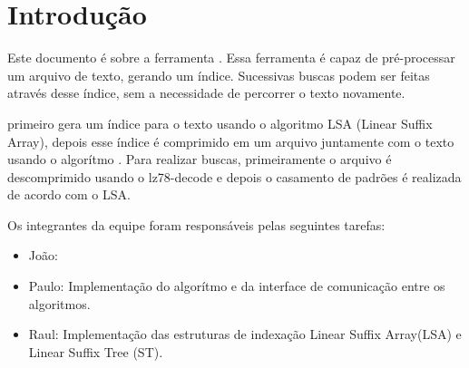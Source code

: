 \section{Introdução}

Este documento é sobre a ferramenta \ipmt. Essa ferramenta é capaz de
pré-processar um arquivo de texto, gerando um índice. Sucessivas buscas podem
ser feitas através desse índice, sem a necessidade de percorrer o texto
novamente.


\ipmt primeiro gera um índice para o texto usando o algoritmo LSA (Linear Suffix
Array), depois esse índice é comprimido em um arquivo juntamente com o texto
usando o algorítmo \lz. Para realizar buscas, primeiramente o arquivo é
descomprimido usando o lz78-decode e depois o casamento de padrões é realizada
de acordo com o LSA. 


Os integrantes da equipe foram responsáveis pelas seguintes tarefas:
\begin{itemize}
\item João: 

\item Paulo: Implementação do algorítmo \lz e da interface de comunicação entre os algoritmos.

\item Raul: Implementação das estruturas de indexação Linear Suffix Array(LSA) e Linear Suffix Tree (ST).

\end{itemize}

